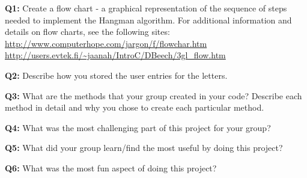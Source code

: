 \documentclass[12pt]{article}
\begin{document}
\vspace*{0.5cm}
\noindent\textbf{Q1:} Create a flow chart - a graphical representation of the sequence of steps needed to implement the Hangman algorithm. For additional information and details on flow charts, see the following sites: \\
\url{http://www.computerhope.com/jargon/f/flowchar.htm}\\
\url{http://users.evtek.fi/~jaanah/IntroC/DBeech/3gl_flow.htm} 

\vspace*{0.5cm}
\noindent\textbf{Q2:} Describe how you stored the user entries for the letters.

\vspace*{0.5cm}
\noindent\textbf{Q3:} What are the methods that your group created in your code? Describe each method in detail and why you chose to create each particular method.

\vspace*{0.5cm}
\noindent\textbf{Q4:} What was the most challenging part of this project for your group?

\vspace*{0.5cm}
\noindent\textbf{Q5:} What did your group learn/find the most useful by doing this project?

\vspace*{0.5cm}
\noindent\textbf{Q6:} What was the most fun aspect of doing this project?
	
\end{document}
